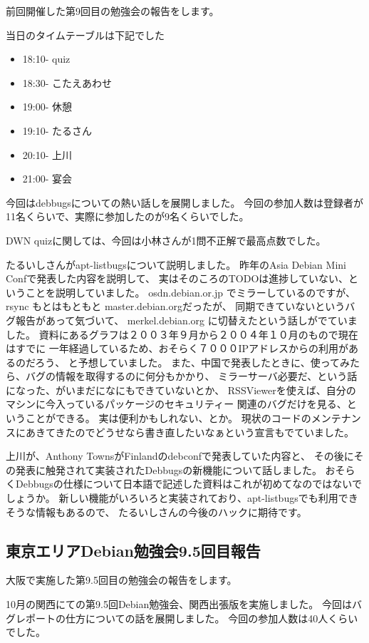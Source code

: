 \documentclass[mingoth,a4paper]{jsarticle}
\begin{document}
前回開催した第9回目の勉強会の報告をします。

当日のタイムテーブルは下記でした
\begin{itemize}
 \item 18:10- quiz
 \item 18:30- こたえあわせ
 \item 19:00- 休憩
 \item 19:10- たるさん
 \item 20:10- 上川
 \item 21:00- 宴会
\end{itemize}

今回はdebbugsについての熱い話しを展開しました。
今回の参加人数は登録者が11名くらいで、実際に参加したのが9名くらいでした。

DWN quizに関しては、今回は小林さんが1問不正解で最高点数でした。

たるいしさんがapt-listbugsについて説明しました。
昨年のAsia Debian Mini Confで発表した内容を説明して、
実はそのころのTODOは進捗していない、ということを説明していました。
osdn.debian.or.jp でミラーしているのですが、rsync もとはもともと master.debian.orgだったが、
同期できていないというバグ報告があって気づいて、 merkel.debian.org に切替えたという話しがでていました。
資料にあるグラフは２００３年９月から２００４年１０月のもので現在はすでに
一年経過しているため、おそらく７０００IPアドレスからの利用があるのだろう、
と予想していました。
また、中国で発表したときに、使ってみたら、バグの情報を取得するのに何分もかかり、
ミラーサーバ必要だ、という話になった、がいまだになにもできていないとか、
RSSViewerを使えば、自分のマシンに今入っているパッケージのセキュリティー
関連のバグだけを見る、ということができる。
実は便利かもしれない、とか。
現状のコードのメンテナンスにあきてきたのでどうせなら書き直したいなぁという宣言もでていました。

上川が、Anthony TownsがFinlandのdebconfで発表していた内容と、
その後にその発表に触発されて実装されたDebbugsの新機能について話しました。
おそらくDebbugsの仕様について日本語で記述した資料はこれが初めてなのではないでしょうか。
新しい機能がいろいろと実装されており、apt-listbugsでも利用できそうな情報もあるので、
たるいしさんの今後のハックに期待です。

\subsection{東京エリアDebian勉強会9.5回目報告}

大阪で実施した第9.5回目の勉強会の報告をします。

	  10月の関西にての第9.5回Debian勉強会、関西出張版を実施しました。
	  今回はバグレポートの仕方についての話を展開しました。
	  今回の参加人数は40人くらいでした。
\end{document}
